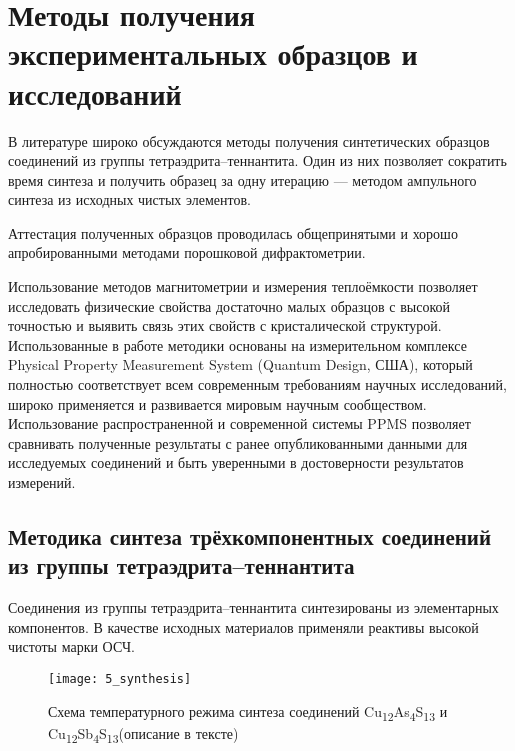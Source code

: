 \chapter{Методы получения экспериментальных образцов и исследований} \label{chapt2}

В литературе широко обсуждаются методы получения синтетических образцов соединений из группы тетраэдрита--теннантита. Один из них позволяет сократить время синтеза и получить образец за одну итерацию --- методом ампульного синтеза из исходных чистых элементов.

Аттестация полученных образцов проводилась общепринятыми и хорошо апробированными методами порошковой дифрактометрии.

Использование методов магнитометрии и измерения теплоёмкости позволяет исследовать физические свойства достаточно малых образцов с  высокой точностью и выявить связь этих свойств с кристалической структурой.
Использованные в работе методики основаны на  измерительном комплексе Physical Property Measurement System (Quantum Design, США), который полностью соответствует всем современным требованиям научных исследований, широко применяется и развивается мировым научным сообществом.
Использование распространенной и современной системы PPMS позволяет сравнивать полученные результаты с ранее опубликованными данными для исследуемых соединений и быть уверенными в достоверности результатов измерений.

\section{Методика синтеза трёхкомпонентных соединений из группы тетраэдрита--теннантита} \label{sect2_1}

Соединения из группы тетраэдрита--теннантита синтезированы из элементарных компонентов.
В качестве исходных материалов применяли реактивы высокой чистоты марки ОСЧ.

\begin{figure}[pt!]
  \begin{minipage}[ht]{0.99\linewidth}\centering
    \texttt{[image: 5\_synthesis]}
  \end{minipage}
       \caption[Схема температурного режима синтеза соединений Cu\textsubscript{12}As\textsubscript{4}S\textsubscript{13} и Cu\textsubscript{12}Sb\textsubscript{4}S\textsubscript{13}]{Схема температурного режима синтеза соединений Cu\textsubscript{12}As\textsubscript{4}S\textsubscript{13} и Cu\textsubscript{12}Sb\textsubscript{4}S\textsubscript{13}(описание в тексте)}
    \label{img:figure3}
\end{figure}

